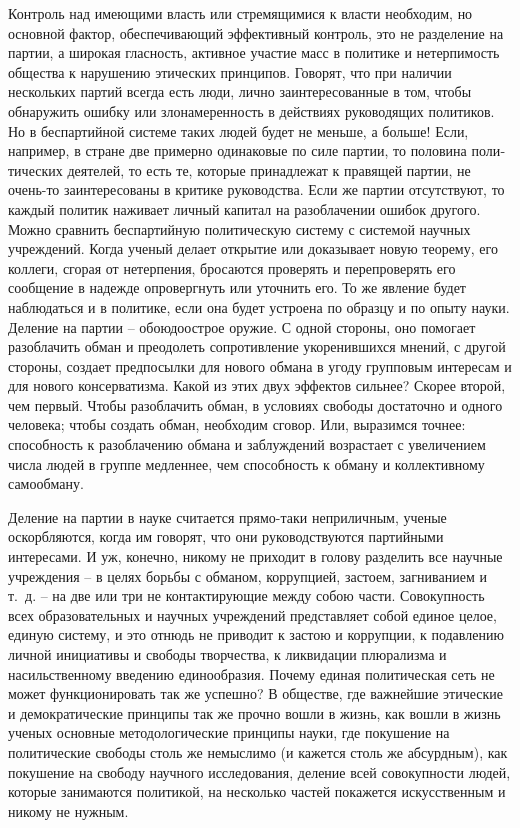 \documentclass{book}
\begin{document}
Контроль над имеющими власть или стремящимися к власти необходим, но основной фактор, обеспечивающий эффективный контроль, это не разделение на партии, а широкая гласность, активное участие масс в политике и нетерпимость общества к нарушению этических принципов. Говорят, что при наличии нескольких партий всегда есть люди, лично заинтересованные в том, чтобы обнаружить ошибку или злонамеренность в дей­ствиях руководящих политиков. Но в беспартийной системе таких людей будет не меньше, а больше! Если, например, в стра­не две примерно одинаковые по силе партии, то половина поли­тических деятелей, то есть те, которые принадлежат к правящей партии, не очень-то заинтересованы в критике руководства. Если же партии отсутствуют, то каждый политик наживает личный капитал на разоблачении ошибок другого. Можно срав­нить беспартийную политическую систему с системой научных учреждений. Когда ученый делает открытие или доказывает новую теорему, его коллеги, сгорая от нетерпения, бросаются проверять и перепроверять его 
сообщение в надежде опроверг­нуть или уточнить его. То же явление будет наблюдаться и в политике, если она будет устроена по образцу и по опыту науки. Деление на партии -- обоюдоострое оружие. С одной стороны, оно помогает разоблачить обман и преодолеть сопротивление укоренившихся мнений, с другой стороны, создает предпосыл­ки для нового обмана в угоду групповым интересам и для но­вого консерватизма. Какой из этих двух эффектов сильнее? Скорее второй, чем первый. Чтобы разоблачить обман, в усло­виях свободы достаточно и одного человека; чтобы создать обман, необходим сговор. Или, выразимся точнее: способность к разоблачению обмана и заблуждений возрастает с увеличе­нием числа людей в группе медленнее, чем способность к обма­ну и коллективному самообману.

Деление на партии в науке считается прямо-таки неприличным, ученые оскорбляются, когда им говорят, что они руководству­ются партийными интересами. И уж, конечно, никому не приходит в голову разделить все научные учреждения -- в целях борьбы с обманом, коррупцией, застоем, загниванием и т.~д. -- на две или три не контактирующие между собою части. Совокупность всех образовательных и научных учреждений пред­ставляет собой единое целое, единую систему, и это отнюдь не приводит к застою и коррупции, к подавлению личной ини­циативы и свободы творчества, к ликвидации плюрализма и насильственному введению единообразия. Почему единая поли­тическая сеть не может функционировать так же успешно? В обществе, где важнейшие этические и демократические прин­ципы так же прочно вошли в жизнь, как вошли в жизнь ученых основные методологические принципы науки, где покушение на политические свободы столь же немыслимо (и кажется столь же абсурдным), как покушение на свободу научного ис­следования, деление всей совокупности людей, 
которые занима­ются политикой, на несколько частей покажется искусственным и никому не нужным.
\end{document}
